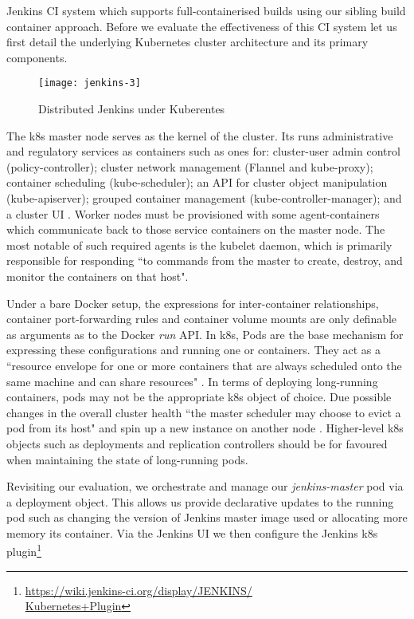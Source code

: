 \documentclass[journal]{IEEEtran}
\begin{document}
Jenkins CI system which supports full-containerised builds using 
our sibling build container approach. Before we evaluate the effectiveness
of this CI system let us first detail the underlying Kubernetes cluster architecture
and its primary components.
\begin{figure}[htp]
      \centering
      \texttt{[image: jenkins-3]}
      \caption{Distributed Jenkins under Kuberentes} 
      \label{fig:jenkins-3}
\end{figure}
\par
The k8s master node serves as the kernel of the cluster.
Its runs administrative and regulatory services as containers 
such as ones for: cluster-user admin control (policy-controller); cluster network 
management (Flannel and kube-proxy); 
container scheduling (kube-scheduler); an API for cluster object manipulation (kube-apiserver);
grouped container management  (kube-controller-manager); and a cluster UI \citep{Verma}. 
Worker nodes must be provisioned with some
agent-containers which communicate back to those service containers
on the master node. The most notable of such required agents is the kubelet daemon,
which is primarily responsible for responding ``to commands from the master
to create, destroy, and monitor the containers on that host".
\par
Under a bare Docker setup, the expressions for inter-container relationships, 
container port-forwarding rules and
container volume mounts are only definable as arguments as to the Docker \textit{run}
API. In k8s, Pods are the base mechanism for expressing these configurations and running one or containers.
They act as a ``resource envelope for one or more containers that are always
scheduled onto the same machine and can share resources" \citep{Verma}.
In terms of deploying long-running containers, pods may not be the appropriate
k8s object of choice. Due possible changes in the overall cluster health 
``the master scheduler may choose to evict a pod from its host" and
spin up a new instance on another node \citep{Rensin}. Higher-level k8s objects 
such as deployments and replication controllers should be for favoured when
maintaining the state of long-running pods.
\par
Revisiting our evaluation, we orchestrate and manage
our \textit{jenkins-master} pod via a deployment object. This allows us provide
declarative updates to the running pod such as changing the version of Jenkins master image used or
allocating more memory its container. Via the Jenkins UI we then configure the Jenkins k8s plugin\footnote{\href{https://wiki.jenkins-ci.org/display/JENKINS/Kubernetes+Plugin}{https://wiki.jenkins-ci.org/display/JENKINS/\\Kubernetes+Plugin}}
\end{document}
